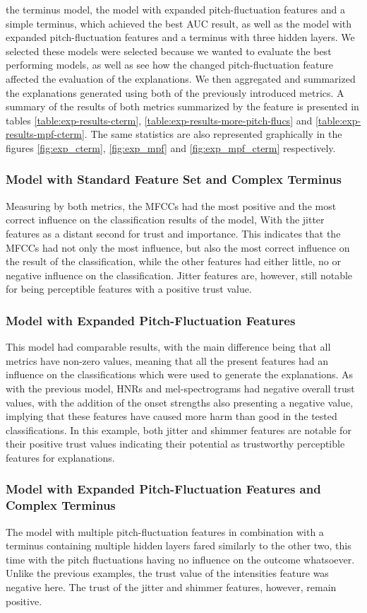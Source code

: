 \documentclass{article}
\begin{document}
		the terminus model, the model with expanded pitch-fluctuation features and a simple
		terminus, which achieved the best AUC result, as well as the model with expanded
		pitch-fluctuation features and a terminus with three hidden layers. We selected these
		models were selected because we wanted to evaluate the best performing models, as well as
		see how the changed pitch-fluctuation feature affected the evaluation of the explanations.
		We then aggregated and summarized the explanations generated using both of the previously
		introduced metrics. A summary of the results of both metrics summarized by the feature is
		presented in tables \ref{table:exp-results-cterm},
		\ref{table:exp-results-more-pitch-flucs} and \ref{table:exp-results-mpf-cterm}. The same
		statistics are also represented graphically in the figures \ref{fig:exp_cterm},
		\ref{fig:exp_mpf} and \ref{fig:exp_mpf_cterm} respectively.
		\subsubsection{Model with Standard Feature Set and Complex Terminus}
		Measuring by both metrics, the MFCCs had the most positive and the most correct influence
		on the classification results of the model, With the jitter features as a distant second
		for trust and importance. This indicates that the MFCCs had not only the most influence,
		but also the most correct influence on the result of the classification, while the other
		features had either little, no or negative influence on the classification. Jitter
		features are, however, still notable for being perceptible features with a positive trust
		value.
		\subsubsection{Model with Expanded Pitch-Fluctuation Features}
		This model had comparable results, with the main difference being that all metrics have
		non-zero values, meaning that all the present features had an influence on the
		classifications which were used to generate the explanations. As with the previous model,
		HNRs and mel-spectrograms had negative overall trust values, with the addition of the
		onset strengths also presenting a negative value, implying that these features have caused
		more harm than good in the tested classifications. In this example, both jitter and
		shimmer features are notable for their positive trust values indicating their potential as
		trustworthy perceptible features for explanations.
		\subsubsection{Model with Expanded Pitch-Fluctuation Features and Complex Terminus}
		The model with multiple pitch-fluctuation features in combination with a terminus
		containing multiple hidden layers fared similarly to the other two, this time with the
		pitch fluctuations having no influence on the outcome whatsoever. Unlike the previous
		examples, the trust value of the intensities feature was negative here. The trust of the
		jitter and shimmer features, however, remain positive.
\end{document}
